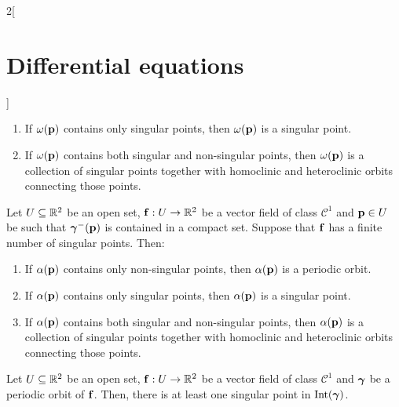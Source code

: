 \documentclass[../../../main.tex]{subfiles}
\begin{document}
\begin{multicols}{2}[\section{Differential equations}]
\begin{theorem}
\begin{enumerate}
      \item If $\omega(\boldsymbol{\mathrm{p}})$ contains only singular points, then $\omega(\boldsymbol{\mathrm{p}})$ is a singular point.
      \item If $\omega(\boldsymbol{\mathrm{p}})$ contains both singular and non-singular points, then $\omega(\boldsymbol{\mathrm{p}})$ is a collection of singular points together with homoclinic and heteroclinic orbits connecting those points.
    \end{enumerate}
  \end{theorem}
  \begin{corollary}
    Let $U\subseteq \mathbb{R}^2$ be an open set, $\boldsymbol{\mathrm{f}}:U\rightarrow\mathbb{R}^2$ be a vector field of class $\mathcal{C}^1$ and $\boldsymbol{\mathrm{p}}\in U$ be such that ${\boldsymbol{\mathrm{\gamma}}}^-(\boldsymbol{\mathrm{p}})$ is contained in a compact set. Suppose that $\boldsymbol{\mathrm{f}}$ has a finite number of singular points. Then:
    \begin{enumerate}
      \item If $\alpha(\boldsymbol{\mathrm{p}})$ contains only non-singular points, then $\alpha(\boldsymbol{\mathrm{p}})$ is a periodic orbit.
      \item If $\alpha(\boldsymbol{\mathrm{p}})$ contains only singular points, then $\alpha(\boldsymbol{\mathrm{p}})$ is a singular point.
      \item If $\alpha(\boldsymbol{\mathrm{p}})$ contains both singular and non-singular points, then $\alpha(\boldsymbol{\mathrm{p}})$ is a collection of singular points together with homoclinic and heteroclinic orbits connecting those points.
    \end{enumerate}
  \end{corollary}
  \begin{corollary}
    Let $U\subseteq \mathbb{R}^2$ be an open set, $\boldsymbol{\mathrm{f}}:U\rightarrow\mathbb{R}^2$ be a vector field of class $\mathcal{C}^1$ and ${\boldsymbol{\mathrm{\gamma}}}$ be a periodic orbit of $\boldsymbol{\mathrm{f}}$. Then, there is at least one singular point in $\operatorname{Int}(\boldsymbol{\mathrm{\gamma}})$.
  \end{corollary}

\end{multicols}
\end{document}
